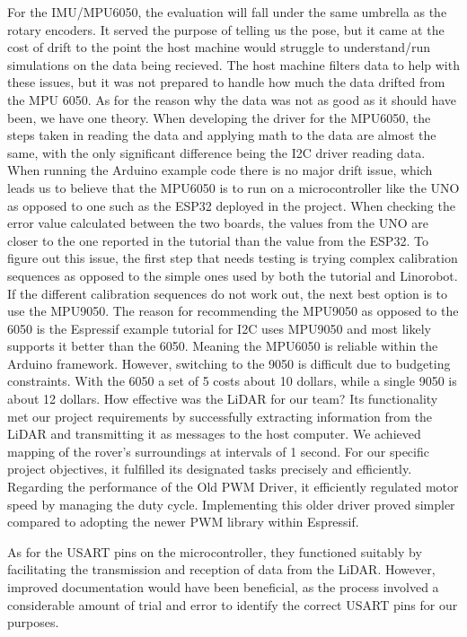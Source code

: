 \documentclass[conference]{IEEEtran}
\begin{document}
For the IMU/MPU6050, the evaluation will fall under the same umbrella as the rotary encoders. It served the purpose of telling us the pose, but it came at the cost of drift to the point the host machine would struggle to understand/run simulations on the data being recieved. The host machine filters data to help with these issues, but it was not prepared to handle how much the data drifted from the MPU 6050. As for the reason why the data was not as good as it should have been, we have one theory. When developing the driver for the MPU6050, the steps taken in reading the data and applying math to the data are almost the same, with the only significant difference being the I2C driver reading data. When running the Arduino example code there is no major drift issue, which leads us to believe that the MPU6050 is to run on a microcontroller like the UNO as opposed to one such as the ESP32 deployed in the project. When checking the error value calculated between the two boards, the values from the UNO are closer to the one reported in the tutorial than the value from the ESP32. To figure out this issue, the first step that needs testing is trying complex calibration sequences as opposed to the simple ones used by both the tutorial and Linorobot. If the different calibration sequences do not work out, the next best option is to use the MPU9050. The reason for recommending the MPU9050 as opposed to the 6050 is the Espressif example tutorial for I2C uses MPU9050 and most likely supports it better than the 6050. Meaning the MPU6050 is reliable within the Arduino framework. However, switching to the 9050 is difficult due to budgeting constraints. With the 6050 a set of 5 costs about 10 dollars, while a single 9050 is about 12 dollars.
How effective was the LiDAR for our team? Its functionality met our project requirements by successfully extracting information from the LiDAR and transmitting it as messages to the host computer. We achieved mapping of the rover's surroundings at intervals of 1 second. For our specific project objectives, it fulfilled its designated tasks precisely and efficiently.
Regarding the performance of the Old PWM Driver, it efficiently regulated motor speed by managing the duty cycle. Implementing this older driver proved simpler compared to adopting the newer PWM library within Espressif.

As for the USART pins on the microcontroller, they functioned suitably by facilitating the transmission and reception of data from the LiDAR. However, improved documentation would have been beneficial, as the process involved a considerable amount of trial and error to identify the correct USART pins for our purposes.
\end{document}
